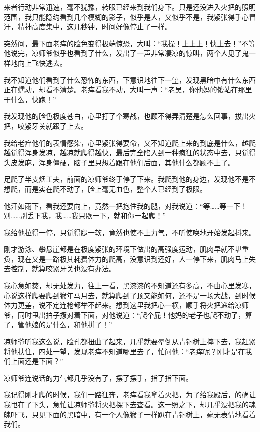 来者行动非常迅速，毫不犹豫，转眼已经来到我们身下。只是还没进入火把的照明范围，我只能隐约看到几个模糊的影子，似乎是人，又似乎不是，我紧张得手心冒汗，精神高度集中，这几秒钟，时间好像停止了一样。

突然间，最下面老痒的脸色变得极端惊恐，大叫：“我操！上上上！快上去！”不等他说完，凉师爷似乎也看到了什么，发出了一声非常凄凉的惊叫，两个人见了鬼一样地向上飞快逃去。

我不知道他们看到了什么恐怖的东西，下意识地往下一望，发现黑暗中有什么东西正在蠕动，却看不清楚。老痒看我不动，大叫一声：“老吴，你他妈的傻站在那里干什么，快跑！”

我发现他的脸色极度苍白，心里打了个寒战，也顾不得弄清楚是怎么回事，拔出火把，咬紧牙关就跟了上去。

我给老痒他们的表情感染，心里紧张得要命，又不知道爬上来的到底是什么，越爬越觉得浑身发凉，越凉就爬得越快，最后完全陷入到一种疯狂的状态中去，只觉得头皮发麻，浑身僵硬，脑子里只想着跟在他们后面，其他什么都顾不上了。

足爬了半支烟工夫，前面的凉师爷终于停了下来。我爬到他的身边，发现他不是不想爬，而是实在爬不动了，脸上毫无血色，整个人已经到了极限。

他汗如雨下，看我还要向上，竟然一把抱住我的腿，对我说道：“等……等一下！别……别丢下我，我……我只歇一下，就和你一起爬！”

我给他拉得一停，只觉得腿一软，竟然也使不上力气，不听使唤地开始发起抖来。

刚才游泳、攀悬崖都是在极度紧张的环境下做出的高强度运动，肌肉早就不堪重负，现在又是一路极其耗费体力的爬高，没意识到还好，人一停下来，肌肉马上失去控制，就算咬紧牙关也没有办法。

我心急如焚，却无处发力，往上一看，黑漆漆的不知道还有多高，不由心里发寒，心说这样爬要爬到猴年马月去，就算爬到了顶又能如何，还不是一场大战，到时候体力更差，说不定连枪都举不起来。想到这里我把心一横，顺手将火把递给凉师爷，同时甩出拍子撩对着下面，对他说道：“爬个屁！他妈的老子也爬不动了，算了，管他娘的是什么，和他拼了！”

凉师爷听我这么说，脸孔都扭曲了起来，几乎就要晕倒从青铜树上摔下去，我赶紧将他扶住，四处一望，发现老痒不知道哪里去了，忙问他：“老痒呢？刚才是在我们上面还是下面？”

凉师爷连说话的力气都几乎没有了，摆了摆手，指了指下面。

我记得刚才爬的时候，我们一路狂奔，老痒看我拿着火把，为了给我殿后，的确让我甩在了下头，急忙让凉师爷将火把探下去查看。这一照之下，却几乎没把我的魂魄吓飞，只见下面的黑暗中，有一个人像猴子一样趴在青铜树上，毫无表情地看着我们。

